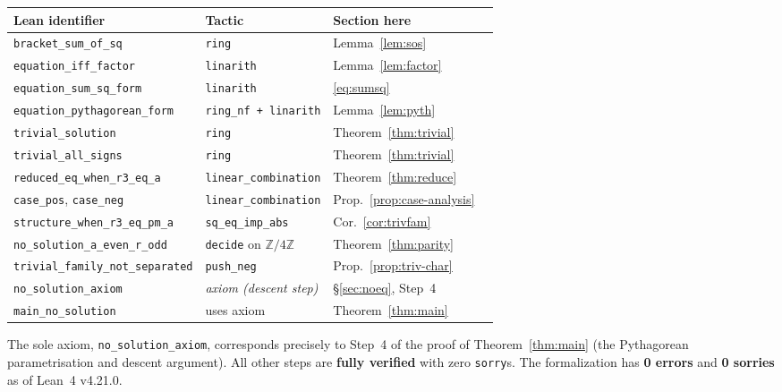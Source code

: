 \documentclass[12pt, a4paper]{article}
\theoremstyle{definition}
\newcommand{\Z}{\mathbb{Z}}
\begin{document}
\begin{center}
\begin{tabular}{llll}
\toprule
\textbf{Lean identifier} & \textbf{Tactic} & \textbf{Section here} \\
\midrule
\texttt{bracket\_sum\_of\_sq}      & \texttt{ring}               & Lemma~\ref{lem:sos} \\
\texttt{equation\_iff\_factor}     & \texttt{linarith}           & Lemma~\ref{lem:factor} \\
\texttt{equation\_sum\_sq\_form}   & \texttt{linarith}           & \eqref{eq:sumsq} \\
\texttt{equation\_pythagorean\_form} & \texttt{ring\_nf + linarith} & Lemma~\ref{lem:pyth} \\
\texttt{trivial\_solution}         & \texttt{ring}               & Theorem~\ref{thm:trivial} \\
\texttt{trivial\_all\_signs}       & \texttt{ring}               & Theorem~\ref{thm:trivial} \\
\texttt{reduced\_eq\_when\_r3\_eq\_a} & \texttt{linear\_combination} & Theorem~\ref{thm:reduce} \\
\texttt{case\_pos}, \texttt{case\_neg} & \texttt{linear\_combination} & Prop.~\ref{prop:case-analysis} \\
\texttt{structure\_when\_r3\_eq\_pm\_a} & \texttt{sq\_eq\_imp\_abs} & Cor.~\ref{cor:trivfam} \\
\texttt{no\_solution\_a\_even\_r\_odd} & \texttt{decide} on $\Z/4\Z$ & Theorem~\ref{thm:parity} \\
\texttt{trivial\_family\_not\_separated} & \texttt{push\_neg} & Prop.~\ref{prop:triv-char} \\
\texttt{no\_solution\_axiom}       & \emph{axiom (descent step)}  & \S\ref{sec:noeq}, Step~4 \\
\texttt{main\_no\_solution}        & uses axiom              & Theorem~\ref{thm:main} \\
\bottomrule
\end{tabular}
\end{center}

\medskip
The sole axiom, \texttt{no\_solution\_axiom}, corresponds precisely to
Step~4 of the proof of Theorem~\ref{thm:main} (the Pythagorean parametrisation
and descent argument).  All other steps are \textbf{fully verified} with zero
\texttt{sorry}s.  The formalization has \textbf{0 errors} and \textbf{0
sorries} as of Lean~4 v4.21.0.

\end{document}
